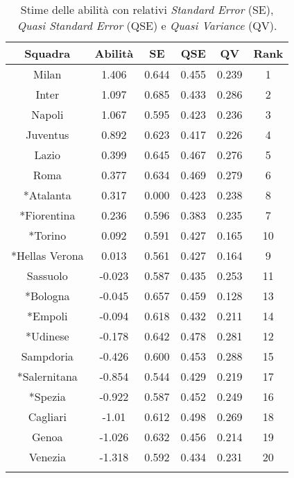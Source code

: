 \begin{table}[!htb]%
	
	\renewcommand{\arraystretch}{1.7}
	\centering
	\begin{tabular}{c c c c c c}
		\hline	
		
		\textbf{Squadra} & \textbf{Abilità} & \textbf{SE} & \textbf{QSE} & \textbf{QV} & \textbf{Rank}   \\	
		\hline			
		Milan & 1.406 & 0.644 & 0.455 & 0.239 & 1\\
		Inter & 1.097 & 0.685 & 0.433 & 0.286 & 2\\
		Napoli & 1.067 & 0.595 & 0.423 & 0.236 & 3 \\		
		Juventus & 0.892 & 0.623 & 0.417& 0.226& 4\\
		Lazio & 0.399 & 0.645 & 0.467 & 0.276 & 5\\
		Roma & 0.377 & 0.634 & 0.469 & 0.279 & 6\\
		*Atalanta & 0.317 & 0.000 & 0.423& 0.238& 8 \\
		*Fiorentina & 0.236 & 0.596 & 0.383 & 0.235& 7\\
		*Torino & 0.092 & 0.591 & 0.427 & 0.165 & 10 \\
		*Hellas Verona & 0.013 & 0.561 & 0.427& 0.164& 9\\
		Sassuolo & -0.023 & 0.587 & 0.435 & 0.253& 11\\
		*Bologna & -0.045 & 0.657& 0.459& 0.128& 13\\
		*Empoli & -0.094 & 0.618& 0.432& 0.211 & 14\\
		*Udinese & -0.178 & 0.642& 0.478 & 0.281& 12\\
		Sampdoria & -0.426 & 0.600 & 0.453& 0.288& 15\\
		*Salernitana & -0.854 & 0.544& 0.429& 0.219& 17\\
		*Spezia & -0.922 & 0.587& 0.452 & 0.249 & 16\\
		Cagliari & -1.01 & 0.612 & 0.498& 0.269 & 18\\
		Genoa & -1.026 & 0.632 & 0.456 & 0.214& 19 \\
		Venezia & -1.318 & 0.592 & 0.434 & 0.231 & 20\\
	
		\hline
		& & & & & \\
		
	\end{tabular} \hbox{}
\caption{Stime delle abilità con relativi \emph{Standard 
		Error} (SE), \emph{Quasi Standard Error} (QSE) e \emph{Quasi Variance} (QV).} \label{tab:BTC}  
\end{table}

